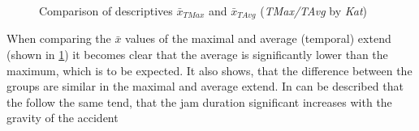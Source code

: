 \begin{figure}[ht!]
	\data
    \pgfplotstablesort[sort key=meanTAvg, sort cmp=float >]{\datasorted}{\data}
    \tiny
    \centering
	\caption{Comparison of descriptives $\bar{x}_{TMax}$ and $\bar{x}_{TAvg}$ (\textit{TMax/TAvg} by \textit{Kat})}
	\label{fig:baysis_matched_meancomparison_Kat_temporal}
\end{figure}
When comparing the $\bar{x}$ values of the maximal and average (temporal) extend (shown in \cref{fig:baysis_matched_meancomparison_Kat_temporal}) it becomes clear that the average is significantly lower than the maximum, which is to be expected. It also shows, that the difference between the groups are similar in the maximal and average extend. In can be described that the follow the same tend, that the jam duration significant increases with the gravity of the accident

